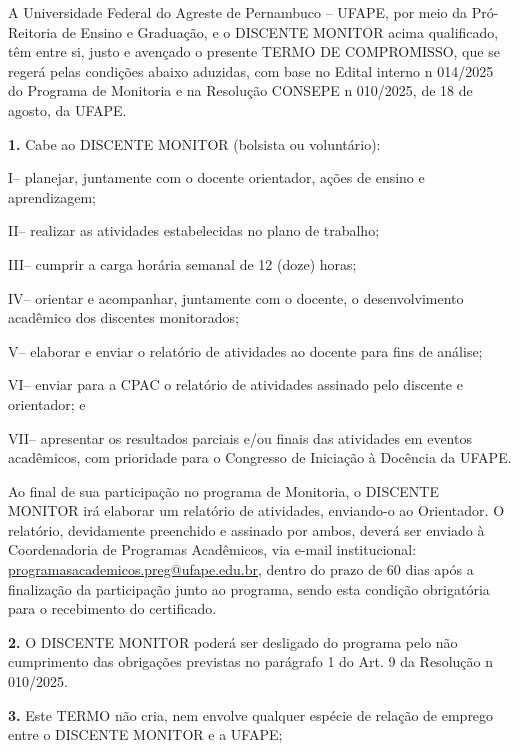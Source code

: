 \documentclass[11pt,a4paper]{article}
\newcommand{\gap}[2]{\vspace{#2mm}}
\newcommand{\itemroman}[2]{%
  \par\begingroup\leftskip=0.5cm\noindent #1-- #2\par\endgroup\vspace{0.6mm}}
\begin{document}
\gap{tabela-texto}{4}

A Universidade Federal do Agreste de Pernambuco -- UFAPE, por meio da Pró-Reitoria de Ensino e Graduação, e o DISCENTE MONITOR acima qualificado, têm entre si, justo e avençado o presente TERMO DE COMPROMISSO, que se regerá pelas condições abaixo aduzidas, com base no Edital interno n\textordmasculine{} 014/2025 do Programa de Monitoria e na Resolução CONSEPE n\textordmasculine{} 010/2025, de 18 de agosto, da UFAPE.

\gap{texto-clausula1}{2}

%
\noindent\textbf{1.} Cabe ao DISCENTE MONITOR (bolsista ou voluntário):
\itemroman{I}{planejar, juntamente com o docente orientador, ações de ensino e aprendizagem;}
\itemroman{II}{realizar as atividades estabelecidas no plano de trabalho;}
\itemroman{III}{cumprir a carga horária semanal de 12 (doze) horas;}
\itemroman{IV}{orientar e acompanhar, juntamente com o docente, o desenvolvimento acadêmico dos discentes monitorados;}
\itemroman{V}{elaborar e enviar o relatório de atividades ao docente para fins de análise;}
\itemroman{VI}{enviar para a CPAC o relatório de atividades assinado pelo discente e orientador; e}
\itemroman{VII}{apresentar os resultados parciais e/ou finais das atividades em eventos acadêmicos, com prioridade para o Congresso de Iniciação à Docência da UFAPE.}

\gap{clausula1-relatorio}{3}
Ao final de sua participação no programa de Monitoria, o DISCENTE MONITOR irá elaborar um relatório de atividades, enviando-o ao Orientador. O relatório, devidamente preenchido e assinado por ambos, deverá ser enviado à Coordenadoria de Programas Acadêmicos, via e-mail institucional: \href{mailto:programasacademicos.preg@ufape.edu.br}{programasacademicos.preg@ufape.edu.br}, dentro do prazo de 60 dias após a finalização da participação junto ao programa, sendo esta condição obrigatória para o recebimento do certificado.

\gap{relatorio-clausula2}{3}
%
\textbf{2.} O DISCENTE MONITOR poderá ser desligado do programa pelo não cumprimento das obrigações previstas no parágrafo 1\textordmasculine{} do Art. 9\textordmasculine{} da Resolução n\textordmasculine{} 010/2025.

\gap{clausula2-clausula3}{2}
%
\textbf{3.} Este TERMO não cria, nem envolve qualquer espécie de relação de emprego entre o DISCENTE MONITOR e a UFAPE;
\end{document}
